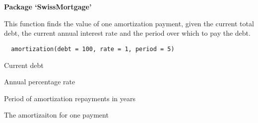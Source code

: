 \documentclass[a4paper]{book}
\begin{document}
\chapter*{}
\begin{center}
{\textbf{\huge Package `SwissMortgage'}}
\par\bigskip{\large \today}
\end{center}
\begin{description}
\raggedright{}
\item[Title]
\item[Description]\AsIs{}
\item[Version]
\item[Author]\AsIs{}
\item[Maintainer]\AsIs{}
\item[Depends]
\item[License]
\item[Collate]
\end{description}
%
\begin{Description}\relax
This function finds the value of one amortization
payment, given the current total debt, the current annual
interest rate and the period over which to pay the debt.
\end{Description}
%
\begin{Usage}
\begin{verbatim}
  amortization(debt = 100, rate = 1, period = 5)
\end{verbatim}
\end{Usage}
%
\begin{Arguments}
\begin{ldescription}
\item[\code{debt}] Current debt

\item[\code{rate}] Annual percentage rate

\item[\code{period}] Period of amortization repayments in years
\end{ldescription}
\end{Arguments}
%
\begin{Value}
The amortizaiton for one payment
\end{Value}
\end{document}
